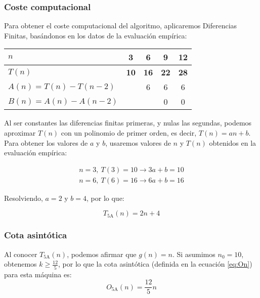 \subsubsection*{Coste computacional}
Para obtener el coste computacional del algoritmo, aplicaremos Diferencias Finitas, basándonos en los datos de la evaluación empírica:

\begin{table}[H]
    \centering
    \begin{tabular}{|l|c|c|c|c|}
        \hline
        $n$    & \textbf{3}  & \textbf{6}  & \textbf{9}  & \textbf{12} \\ \hline
        $T(n)$ & \textbf{10} & \textbf{16} & \textbf{22} & \textbf{28} \\ \hline
        \hline
        $A(n) = T(n) - T(n-2)$ &   & 6 & 6 & 6 \\ \hline
        $B(n) = A(n) - A(n-2)$ &   &   & 0 & 0 \\ \hline
    \end{tabular}
    \label{tab:5A}
\end{table}

Al ser constantes las diferencias finitas primeras, y nulas las segundas, podemos aproximar $T(n)$ con un polinomio de primer orden, es decir, $T(n) = an + b$.\\

Para obtener los valores de $a$ y $b$, usaremos valores de $n$ y $T(n)$ obtenidos en la evaluación empírica:

\begin{subequations}
    \begin{gather}
        n = 3,\ T(3) = 10 \rightarrow 3a + b = 10 \\
        n = 6,\ T(6) = 16 \rightarrow 6a + b = 16
    \end{gather}
\end{subequations}

Resolviendo, $a=2$ y $b=4$, por lo que:

\begin{equation}
    T_{\mathrm{5A}}(n) = 2n + 4
\end{equation}


\subsubsection*{Cota asintótica}
Al conocer $T_{\mathrm{5A}}(n)$, podemos afirmar que $g(n) = n$. Si asumimos $n_0 = 10$, obtenemos $k \geq \frac{12}{5}$, por lo que la cota asintótica (definida en la ecuación \ref{eq:On}) para esta máquina es:
\begin{equation}
    O_{\mathrm{5A}}(n) = \frac{12}{5} n
\end{equation}

